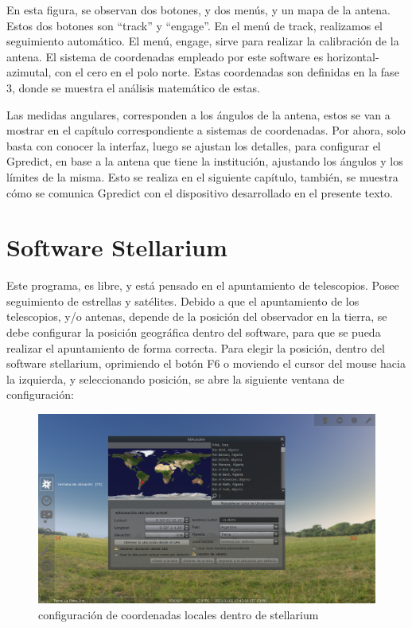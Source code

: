 En esta figura, se observan dos botones, y dos menús, y un mapa de la antena. Estos dos botones son ``track'' y ``engage''. En el menú de track, realizamos el seguimiento automático. El menú, engage, sirve para realizar la calibración de la antena. El sistema de coordenadas empleado por este software es horizontal-azimutal, con el cero en el polo norte. Estas coordenadas son definidas en la fase 3, donde se muestra el análisis matemático de estas.  

Las medidas angulares, corresponden a los ángulos de la antena, estos se van a mostrar en el capítulo correspondiente a sistemas de coordenadas. Por ahora, solo basta con conocer la interfaz, luego se ajustan los detalles, para configurar el Gpredict, en base a la antena que tiene la institución, ajustando los ángulos y los límites de la misma. Esto se realiza en el siguiente capítulo, también, se muestra cómo se comunica Gpredict con el dispositivo desarrollado en el presente texto. 


 
\section{Software Stellarium} 


Este programa, es libre, y está pensado en el apuntamiento de telescopios. Posee seguimiento de estrellas y satélites. Debido a que el apuntamiento de los telescopios, y/o antenas, depende de la posición del observador en la tierra, se debe configurar la posición geográfica dentro del software, para que se pueda realizar el apuntamiento de forma correcta. Para elegir la posición, dentro del software stellarium, oprimiendo el botón F6 o moviendo el cursor del mouse hacia la izquierda, y seleccionando posición, se abre la siguiente ventana de configuración: 
\begin{figure}[ht]
	\includegraphics[width=\textwidth]{stel_sel_pos} 
	\caption{configuración de coordenadas locales dentro de stellarium} 
	\label{fig:stell_poss_conf}
\end{figure}


